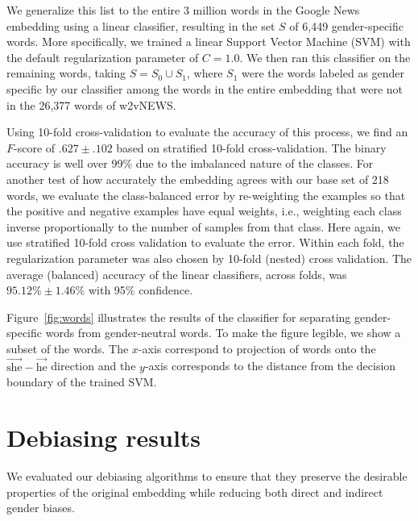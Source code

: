 \documentclass{article}
\newcommand{\wvec}[1]{\overrightarrow{\text{#1}}}
\begin{document}
We generalize this list to the entire 3 million words in the Google News embedding using a linear classifier, resulting in the set $S$ of 6,449 gender-specific words. More specifically, we trained a linear Support Vector Machine (SVM) with the default regularization parameter of $C=1.0$. We then ran this classifier on the remaining words, taking $S=S_0\cup S_1$, where $S_1$ were the words labeled as gender specific by our classifier among the words in the entire embedding that were not in the 26,377 words of w2vNEWS.

Using 10-fold cross-validation to evaluate the accuracy of this process, we find an $F$-score of $.627 \pm .102$ based on stratified 10-fold cross-validation. The binary accuracy is well over 99\% due to the imbalanced nature of the classes. For another test of how accurately the embedding agrees with our base set of 218 words, we evaluate the class-balanced error by re-weighting the examples so that the positive and negative examples have equal weights, i.e., weighting each class inverse proportionally to the number of samples from that class. Here again, we use stratified 10-fold cross validation to evaluate the error. Within each fold, the regularization parameter was also chosen by 10-fold (nested) cross validation. The average (balanced) accuracy of the linear classifiers, across folds, was $95.12\% \pm 1.46\%$ with 95\% confidence. 

Figure~\ref{fig:words} illustrates the results of the classifier for separating gender-specific words from gender-neutral words. To make the figure legible, we show a subset of the words. The $x$-axis correspond to projection of words onto the $\wvec{she} - \wvec{he}$ direction and the $y$-axis corresponds to the distance from the decision boundary of the trained SVM. 

\section{Debiasing results}\label{sec:debiasing_results}

We evaluated our debiasing algorithms to ensure that they preserve the desirable properties of the original embedding while reducing both direct and indirect gender biases.
\end{document}
